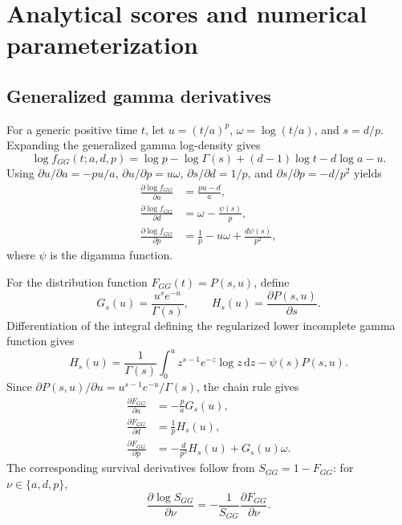 \documentclass[11pt]{article}
\begin{document}
\section{Analytical scores and numerical parameterization}\label{sec:supp-scores}

\subsection{Generalized gamma derivatives}

For a generic positive time $t$, let $u=(t/a)^p$, $\omega=\log(t/a)$, and $s=d/p$. Expanding the generalized gamma log-density gives
\begin{equation}
\log f_{GG}(t;a,d,p)
=\log p-\log\Gamma(s)+(d-1)\log t-d\log a-u.
\label{eq:supp-logdensity-expansion}
\end{equation}
Using $\partial u/\partial a=-pu/a$, $\partial u/\partial p=u\omega$, $\partial s/\partial d=1/p$, and $\partial s/\partial p=-d/p^2$ yields
\begin{equation}
\begin{aligned}
\frac{\partial\log f_{GG}}{\partial a}&=\frac{pu-d}{a},\\
\frac{\partial\log f_{GG}}{\partial d}&=\omega-\frac{\psi(s)}{p},\\
\frac{\partial\log f_{GG}}{\partial p}&=\frac{1}{p}-u\omega+\frac{d\psi(s)}{p^2},
\end{aligned}
\label{eq:supp-logdensity-gradient}
\end{equation}
where $\psi$ is the digamma function.

For the distribution function $F_{GG}(t)=P(s,u)$, define
\begin{equation}
G_s(u)=\frac{u^s e^{-u}}{\Gamma(s)},
\qquad
H_s(u)=\frac{\partial P(s,u)}{\partial s}.
\end{equation}
Differentiation of the integral defining the regularized lower incomplete gamma function gives
\begin{equation}
H_s(u)
=\frac{1}{\Gamma(s)}
\int_0^u z^{s-1}e^{-z}\log z\,\mathrm dz
-\psi(s)P(s,u).
\label{eq:supp-incomplete-gamma-shape}
\end{equation}
Since $\partial P(s,u)/\partial u=u^{s-1}e^{-u}/\Gamma(s)$, the chain rule gives
\begin{equation}
\begin{aligned}
\frac{\partial F_{GG}}{\partial a}&=-\frac{p}{a}G_s(u),\\
\frac{\partial F_{GG}}{\partial d}&=\frac{1}{p}H_s(u),\\
\frac{\partial F_{GG}}{\partial p}&=-\frac{d}{p^2}H_s(u)+G_s(u)\omega.
\end{aligned}
\label{eq:supp-cdf-gradient}
\end{equation}
The corresponding survival derivatives follow from $S_{GG}=1-F_{GG}$: for $\nu\in\{a,d,p\}$,
\begin{equation}
\frac{\partial\log S_{GG}}{\partial\nu}
=-\frac{1}{S_{GG}}\frac{\partial F_{GG}}{\partial\nu}.
\label{eq:supp-logsurvival-gradient}
\end{equation}
\end{document}
